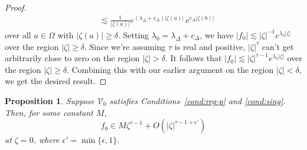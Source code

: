\documentclass{article}
\theoremstyle{plain}
\newtheorem{prop}{Proposition}
\newcommand{\hardpart}{\mathcal{V}_0}
\newcommand{\solproto}{f_0}
\newcommand{\domain}{\Omega}
\begin{document}
\begin{proof}
\begin{align*}
& \lesssim \frac{1}{|\zeta(a)|} e^{(\lambda_\Delta + c_\Delta)|\zeta(a)|}\,e^{c_\Delta|\zeta(b)|}
\end{align*}
over all $a \in \domain$ with $|\zeta(a)| \ge \delta$. Setting $\lambda_0 = \lambda_\Delta + c_\Delta$, we have $|\solproto| \lesssim |\zeta|^{-1} e^{\lambda_0|\zeta|}$ over the region $|\zeta| \ge \delta$. Since we're assuming $\tau$ is real and positive, $|\zeta|^\tau$ can't get arbitrarily close to zero on the region $|\zeta| > \delta$. It follows that $|\solproto| \lesssim |\zeta|^{\tau-1} e^{\lambda_0|\zeta|}$ over the region $|\zeta| \ge \delta$. Combining this with our earlier argument on the region $|\zeta| < \delta$, we get the desired result.
\end{proof}
\begin{prop}\label{prop:better-proto-estimate}
Suppose $\hardpart$ satisfies {\em Conditions~\eqref{cond:reg-p}} and \eqref{cond:sing}. Then, for some constant $M$,
\[ \solproto \in M\zeta^{\tau-1} + O(|\zeta|^{\tau-1+\epsilon'}) \]
at $\zeta = 0$, where $\epsilon'=\min\{\epsilon, 1\}$.
\end{prop}
\end{document}
